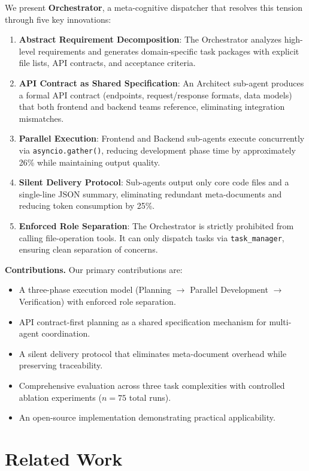 \documentclass[12pt]{article}
\begin{document}
We present \textbf{Orchestrator}, a meta-cognitive dispatcher that resolves this tension through five key innovations:

\begin{enumerate}
  \item \textbf{Abstract Requirement Decomposition}: The Orchestrator analyzes high-level requirements and generates domain-specific task packages with explicit file lists, API contracts, and acceptance criteria.
  \item \textbf{API Contract as Shared Specification}: An Architect sub-agent produces a formal API contract (endpoints, request/response formats, data models) that both frontend and backend teams reference, eliminating integration mismatches.
  \item \textbf{Parallel Execution}: Frontend and Backend sub-agents execute concurrently via \texttt{asyncio.gather()}, reducing development phase time by approximately 26\% while maintaining output quality.
  \item \textbf{Silent Delivery Protocol}: Sub-agents output only core code files and a single-line JSON summary, eliminating redundant meta-documents and reducing token consumption by 25\%.
  \item \textbf{Enforced Role Separation}: The Orchestrator is strictly prohibited from calling file-operation tools. It can only dispatch tasks via \texttt{task\_manager}, ensuring clean separation of concerns.
\end{enumerate}

\textbf{Contributions.} Our primary contributions are:
\begin{itemize}
  \item A three-phase execution model (Planning $\rightarrow$ Parallel Development $\rightarrow$ Verification) with enforced role separation.
  \item API contract-first planning as a shared specification mechanism for multi-agent coordination.
  \item A silent delivery protocol that eliminates meta-document overhead while preserving traceability.
  \item Comprehensive evaluation across three task complexities with controlled ablation experiments ($n=75$ total runs).
  \item An open-source implementation demonstrating practical applicability.
\end{itemize}

\section{Related Work}
\end{document}
